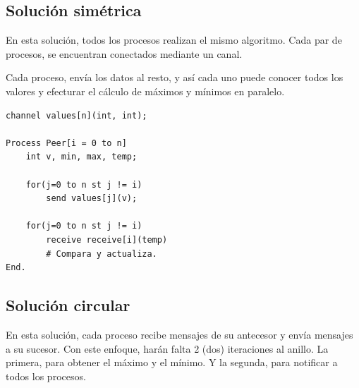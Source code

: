 \documentclass[a4paper, 10pt]{report}
\begin{document}
\subsection{Solución simétrica}

En esta solución, todos los procesos realizan el mismo algoritmo. Cada par de procesos, se encuentran conectados mediante un canal.

Cada proceso, envía los datos al resto, y así cada uno puede conocer todos los valores y efecturar el cálculo de máximos y mínimos en paralelo.

\begin{multicols}{2}
\begin{lstlisting}
channel values[n](int, int);

Process Peer[i = 0 to n]
    int v, min, max, temp;

    for(j=0 to n st j != i)
        send values[j](v);

    for(j=0 to n st j != i)
        receive receive[i](temp)
        # Compara y actualiza.
End.
\end{lstlisting}

\columnbreak
    
\centering
\vspace*{\fill}
\vspace*{\fill}
\end{multicols}

\subsection{Solución circular}

En esta solución, cada proceso recibe mensajes de su antecesor y envía mensajes a su sucesor. Con este enfoque, harán falta 2 (dos) iteraciones al anillo. La primera, para obtener el máximo y el mínimo. Y la segunda, para notificar a todos los procesos.
\end{document}
